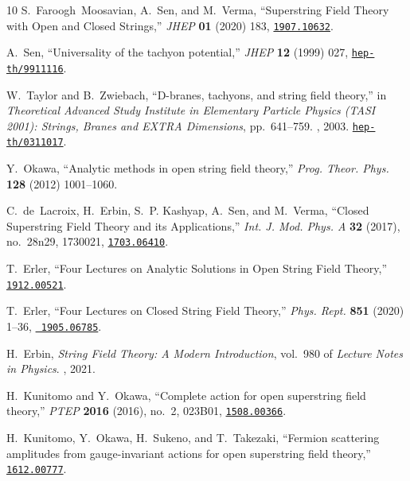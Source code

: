 \documentclass[12pt,a4paper]{article}
\begin{document}
\begin{thebibliography}{10}
	S.~Faroogh~Moosavian, A.~Sen, and M.~Verma, ``{Superstring Field Theory with
		Open and Closed Strings},'' {\em JHEP} {\bf 01} (2020) 183,
	\href{http://www.arXiv.org/abs/1907.10632}{{\tt 1907.10632}}.
	
	A.~Sen, ``{Universality of the tachyon potential},'' {\em JHEP} {\bf 12} (1999)
	027, \href{http://www.arXiv.org/abs/hep-th/9911116}{{\tt hep-th/9911116}}.
	
	W.~Taylor and B.~Zwiebach, ``{D-branes, tachyons, and string field theory},''
	in {\em {Theoretical Advanced Study Institute in Elementary Particle Physics
			(TASI 2001): Strings, Branes and EXTRA Dimensions}}, pp.~641--759.
	, 2003.
	\newblock \href{http://www.arXiv.org/abs/hep-th/0311017}{{\tt hep-th/0311017}}.
	
	Y.~Okawa, ``{Analytic methods in open string field theory},'' {\em Prog. Theor.
		Phys.} {\bf 128} (2012) 1001--1060.
	
	C.~de~Lacroix, H.~Erbin, S.~P. Kashyap, A.~Sen, and M.~Verma, ``{Closed
		Superstring Field Theory and its Applications},'' {\em Int. J. Mod. Phys. A}
	{\bf 32} (2017), no.~28n29, 1730021,
	\href{http://www.arXiv.org/abs/1703.06410}{{\tt 1703.06410}}.
	
	T.~Erler, ``{Four Lectures on Analytic Solutions in Open String Field
		Theory},'' \href{http://www.arXiv.org/abs/1912.00521}{{\tt 1912.00521}}.
	
	T.~Erler, ``{Four Lectures on Closed String Field Theory},'' {\em Phys. Rept.}
	{\bf 851} (2020) 1--36, \href{http://www.arXiv.org/abs/1905.06785}{{\tt
			1905.06785}}.
	
	H.~Erbin, {\em {String Field Theory: A Modern Introduction}}, vol.~980 of {\em
		Lecture Notes in Physics}.
	, 2021.
	
	H.~Kunitomo and Y.~Okawa, ``{Complete action for open superstring field
		theory},'' {\em PTEP} {\bf 2016} (2016), no.~2, 023B01,
	\href{http://www.arXiv.org/abs/1508.00366}{{\tt 1508.00366}}.
	
	H.~Kunitomo, Y.~Okawa, H.~Sukeno, and T.~Takezaki, ``{Fermion scattering
		amplitudes from gauge-invariant actions for open superstring field theory},''
	\href{http://www.arXiv.org/abs/1612.00777}{{\tt 1612.00777}}.
	

\end{thebibliography}
\end{document}
